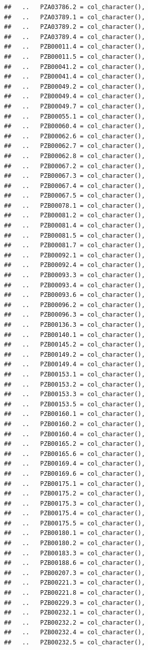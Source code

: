 \documentclass[
]{article}
\begin{document}
\begin{verbatim}
##   ..   PZA03786.2 = col_character(),
##   ..   PZA03789.1 = col_character(),
##   ..   PZA03789.2 = col_character(),
##   ..   PZA03789.4 = col_character(),
##   ..   PZB00011.4 = col_character(),
##   ..   PZB00011.5 = col_character(),
##   ..   PZB00041.2 = col_character(),
##   ..   PZB00041.4 = col_character(),
##   ..   PZB00049.2 = col_character(),
##   ..   PZB00049.4 = col_character(),
##   ..   PZB00049.7 = col_character(),
##   ..   PZB00055.1 = col_character(),
##   ..   PZB00060.4 = col_character(),
##   ..   PZB00062.6 = col_character(),
##   ..   PZB00062.7 = col_character(),
##   ..   PZB00062.8 = col_character(),
##   ..   PZB00067.2 = col_character(),
##   ..   PZB00067.3 = col_character(),
##   ..   PZB00067.4 = col_character(),
##   ..   PZB00067.5 = col_character(),
##   ..   PZB00078.1 = col_character(),
##   ..   PZB00081.2 = col_character(),
##   ..   PZB00081.4 = col_character(),
##   ..   PZB00081.5 = col_character(),
##   ..   PZB00081.7 = col_character(),
##   ..   PZB00092.1 = col_character(),
##   ..   PZB00092.4 = col_character(),
##   ..   PZB00093.3 = col_character(),
##   ..   PZB00093.4 = col_character(),
##   ..   PZB00093.6 = col_character(),
##   ..   PZB00096.2 = col_character(),
##   ..   PZB00096.3 = col_character(),
##   ..   PZB00136.3 = col_character(),
##   ..   PZB00140.1 = col_character(),
##   ..   PZB00145.2 = col_character(),
##   ..   PZB00149.2 = col_character(),
##   ..   PZB00149.4 = col_character(),
##   ..   PZB00153.1 = col_character(),
##   ..   PZB00153.2 = col_character(),
##   ..   PZB00153.3 = col_character(),
##   ..   PZB00153.5 = col_character(),
##   ..   PZB00160.1 = col_character(),
##   ..   PZB00160.2 = col_character(),
##   ..   PZB00160.4 = col_character(),
##   ..   PZB00165.2 = col_character(),
##   ..   PZB00165.6 = col_character(),
##   ..   PZB00169.4 = col_character(),
##   ..   PZB00169.6 = col_character(),
##   ..   PZB00175.1 = col_character(),
##   ..   PZB00175.2 = col_character(),
##   ..   PZB00175.3 = col_character(),
##   ..   PZB00175.4 = col_character(),
##   ..   PZB00175.5 = col_character(),
##   ..   PZB00180.1 = col_character(),
##   ..   PZB00180.2 = col_character(),
##   ..   PZB00183.3 = col_character(),
##   ..   PZB00188.6 = col_character(),
##   ..   PZB00207.3 = col_character(),
##   ..   PZB00221.3 = col_character(),
##   ..   PZB00221.8 = col_character(),
##   ..   PZB00229.3 = col_character(),
##   ..   PZB00232.1 = col_character(),
##   ..   PZB00232.2 = col_character(),
##   ..   PZB00232.4 = col_character(),
##   ..   PZB00232.5 = col_character(),

\end{verbatim}
\end{document}
